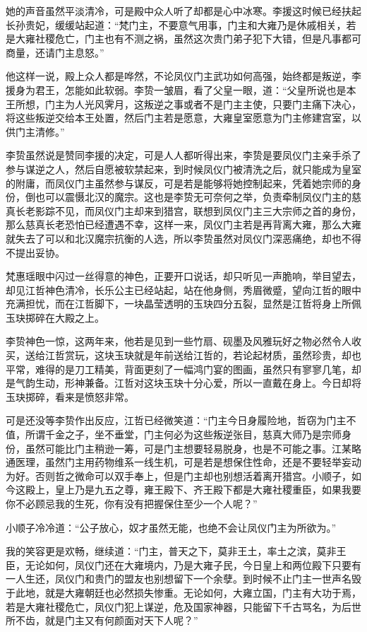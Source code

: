 她的声音虽然平淡清冷，可是殿中众人听了却都是心中冰寒。李援这时候已经扶起长孙贵妃，缓缓站起道：“梵门主，不要意气用事，门主和大雍乃是休戚相关，若是大雍社稷危亡，门主也有不测之祸，虽然这次贵门弟子犯下大错，但是凡事都可商量，还请门主息怒。”

他这样一说，殿上众人都是哗然，不论凤仪门主武功如何高强，始终都是叛逆，李援身为君王，怎能如此软弱。李贽一皱眉，看了父皇一眼，道：“父皇所说也是本王所想，门主为人光风霁月，这叛逆之事或者不是门主主使，只要门主痛下决心，将这些叛逆交给本王处置，然后门主若是愿意，大雍皇室愿意为门主修建宫室，以供门主清修。”

李贽虽然说是赞同李援的决定，可是人人都听得出来，李贽是要凤仪门主亲手杀了参与谋逆之人，然后自愿被软禁起来，到时候凤仪门被清洗之后，就只能成为皇室的附庸，而凤仪门主虽然参与谋反，可是若是能够将她控制起来，凭着她宗师的身份，倒也可以震慑北汉的魔宗。这也是李贽无可奈何之举，负责牵制凤仪门主的慈真长老影踪不见，而凤仪门主却来到猎宫，联想到凤仪门主三大宗师之首的身份，那么慈真长老恐怕已经遭遇不幸，这样一来，凤仪门主若是再背离大雍，那么大雍就失去了可以和北汉魔宗抗衡的人选，所以李贽虽然对凤仪门深恶痛绝，却也不得不提出妥协。

梵惠瑶眼中闪过一丝得意的神色，正要开口说话，却只听见一声脆响，举目望去，却见江哲神色清冷，长乐公主已经站起，站在他身侧，秀眉微蹙，望向江哲的眼中充满担忧，而在江哲脚下，一块晶莹透明的玉玦四分五裂，显然是江哲将身上所佩玉玦掷碎在大殿之上。

李贽神色一惊，这两年来，他若是见到一些竹扇、砚墨及风雅玩好之物必然令人收买，送给江哲赏玩，这块玉玦就是年前送给江哲的，若论起材质，虽然珍贵，却也平常，难得的是刀工精美，背面更刻了一幅鸿门宴的图画，虽然只有寥寥几笔，却是气韵生动，形神兼备。江哲对这块玉玦十分心爱，所以一直戴在身上。今日却将玉玦掷碎，看来是愤怒非常。

可是还没等李贽作出反应，江哲已经微笑道：“门主今日身履险地，哲窃为门主不值，所谓千金之子，坐不垂堂，门主何必为这些叛逆张目，慈真大师乃是宗师身份，虽然可能比门主稍逊一筹，可是门主想要轻易脱身，也是不可能之事。江某略通医理，虽然门主用药物维系一线生机，可是若是想保住性命，还是不要轻举妄动为好。否则哲之微命可以双手奉上，但是门主却也别想活着离开猎宫。小顺子，如今这殿上，皇上乃是九五之尊，雍王殿下、齐王殿下都是大雍社稷重臣，如果我要你不必顾忌我的生死，你有没有把握保住至少一个人呢？”

小顺子冷冷道：“公子放心，奴才虽然无能，也绝不会让凤仪门主为所欲为。”

我的笑容更是欢畅，继续道：“门主，普天之下，莫非王土，率土之滨，莫非王臣，无论如何，凤仪门还在大雍境内，乃是大雍子民，今日皇上和两位殿下只要有一人生还，凤仪门和贵门的盟友也别想留下一个余孽。到时候不止门主一世声名毁于此地，就是大雍朝廷也必然损失惨重。无论如何，大雍立国，门主有大功于焉，若是大雍社稷危亡，凤仪门犯上谋逆，危及国家神器，只能留下千古骂名，为后世所不齿，就是门主又有何颜面对天下人呢？”

